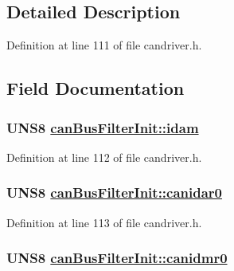\subsection{Detailed Description}




Definition at line 111 of file candriver.h.

\subsection{Field Documentation}
\hypertarget{structcanBusFilterInit_bd65e55b40839cc85917717124ba8ff7}{
\subsubsection[idam]{\setlength{\rightskip}{0pt plus 5cm}UNS8 \hyperlink{structcanBusFilterInit_bd65e55b40839cc85917717124ba8ff7}{can\-Bus\-Filter\-Init::idam}}}
\label{structcanBusFilterInit_bd65e55b40839cc85917717124ba8ff7}




Definition at line 112 of file candriver.h.\hypertarget{structcanBusFilterInit_e73e4472088781055b2c634529a6c91e}{
\subsubsection[canidar0]{\setlength{\rightskip}{0pt plus 5cm}UNS8 \hyperlink{structcanBusFilterInit_e73e4472088781055b2c634529a6c91e}{can\-Bus\-Filter\-Init::canidar0}}}
\label{structcanBusFilterInit_e73e4472088781055b2c634529a6c91e}




Definition at line 113 of file candriver.h.\hypertarget{structcanBusFilterInit_73219612204df8b0eece12ebf4fbb491}{
\subsubsection[canidmr0]{\setlength{\rightskip}{0pt plus 5cm}UNS8 \hyperlink{structcanBusFilterInit_73219612204df8b0eece12ebf4fbb491}{can\-Bus\-Filter\-Init::canidmr0}}}
\label{structcanBusFilterInit_73219612204df8b0eece12ebf4fbb491}




